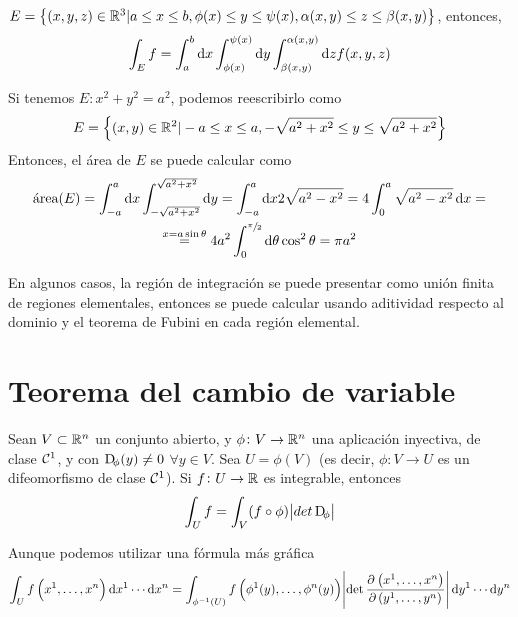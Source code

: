 \begin{example*}
    $E = \left\{(x, y, z) \in \mathbb{R}^3 \vert a \leq x \leq b, \phi(x) \leq y \leq \psi(x), \alpha(x, y) \leq z \leq \beta(x,y)\right\}$,
    entonces,
    \[
        \int_E f = \int^b_a \dif x \int^{\psi(x)}_{\phi(x)} \dif y \int^{\alpha(x,y)}_{\beta\left( x, y \right)} \dif z f(x, y, z)
    \]
\end{example*}

\begin{example*}
    Si tenemos $E: x^2 + y^2 = a^2$, podemos reescribirlo como
    \[
        E = \left\{(x,y) \in \mathbb{R}^2 \vert -a \leq x \leq a, -\sqrt{a^2 + x^2} \leq y \leq \sqrt{a^2 + x^2}\right\}
    \]
    Entonces, el área de $E$ se puede calcular como
    \begin{gather*}
        \text{área}(E) = \int^a_{-a} \dif x \int^{\sqrt{a^2 + x^2}}_{-\sqrt{a^2 + x^2}} \dif y =
        \int^a_{-a} \dif x 2 \sqrt{a^2 - x^2} = 4 \int^a_0 \sqrt{a^2 - x^2} \dif x = \\
        \stackrel{x = a\sin\theta}{=} 4 a^2 \int^{\sfrac{\pi}{2}}_0 \dif \theta \cos^2 \theta = \pi a^2
    \end{gather*}
\end{example*}

\begin{obs}
    En algunos casos, la región de integración se puede presentar como unión finita de regiones elementales, entonces se puede
    calcular usando aditividad respecto al dominio y el teorema de Fubini en cada región elemental.
\end{obs}

\section{Teorema del cambio de variable}

\begin{teo}\label{teo:cambio_variable}
    Sean $V \subset \mathbb{R}^n$ un conjunto abierto, y $\phi \colon V \to \mathbb{R}^n$ una aplicación inyectiva, de clase $\mathcal{C}^1$, y 
    con $\Dif_\phi(y) \neq 0$ $\forall y \in V$. Sea $U = \phi(V)$ (es decir, $\phi \colon V \to U$ es un difeomorfismo de clase
    $\mathcal{C}^1$). Si $f \colon U \to \mathbb{R}$ es integrable, entonces
    \[
        \int_U f = \int_V (f \circ \phi) \abs{det \Dif_\phi}
    \]

    Aunque podemos utilizar una fórmula más gráfica
    \[
        \int_U f \left( x^1, \dots, x^n \right) \dif x^1 \cdots \dif x^n =
        \int_{\inv{\phi}(U)} f\left( \phi^1(y), \dots, \phi^n(y) \right) \abs{\det\pdv{\left(x^1,\dots,x^n\right)}{\left(y^1,\dots,y^n\right)}}
        \dif y^1 \cdots \dif y^n
    \]
\end{teo}

